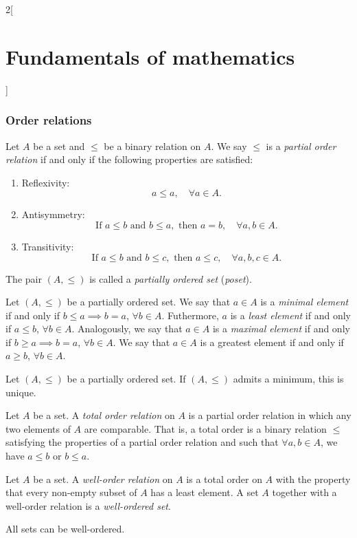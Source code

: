 \documentclass[../../../main.tex]{subfiles}
\begin{document}
\begin{multicols}{2}[\section{Fundamentals of mathematics}]
  \subsubsection{Order relations}
  \begin{definition}\label{FM_order-relations}
    Let $A$ be a set and $\leq$ be a binary relation on $A$. We say $\leq$ is a \emph{partial order relation} if and only if the following properties are satisfied:
    \begin{enumerate}
      \item Reflexivity:
            $$a\leq a,\quad\forall a\in A.$$
      \item Antisymmetry:
            $$\text{If }a\leq b\text{ and }b\leq a,\text{ then }a=b,\quad\forall a,b\in A.$$
      \item Transitivity:
            $$\text{If }a\leq b\text{ and }b\leq c,\text{ then }a\leq c,\quad\forall a,b,c\in A.$$
    \end{enumerate}
    The pair $(A,\leq)$ is called a \emph{partially ordered set} (\emph{poset}).
  \end{definition}
  \begin{definition}
    Let $(A,\leq)$ be a partially ordered set. We say that $a\in A$ is a \emph{minimal element} if and only if $b\leq a\implies b=a$, $\forall b\in A$. Futhermore, $a$ is a \emph{least element} if and only if $a\leq b$, $\forall b\in A$. Analogously, we say that $a\in A$ is a \emph{maximal element} if and only if $b\geq a\implies b=a$, $\forall b\in A$. We say that $a\in A$ is a greatest element if and only if $a\geq b$, $\forall b\in A$.
  \end{definition}
  \begin{lemma}
    Let $(A,\leq)$ be a partially ordered set. If $(A,\leq)$ admits a minimum, this is unique.
  \end{lemma}
  \begin{definition}
    Let $A$ be a set. A \emph{total order relation} on $A$ is a partial order relation in which any two elements of $A$ are comparable. That is, a total order is a binary relation $\leq$ satisfying the properties of a partial order relation and such that $\forall a,b\in A$, we have $a\leq b$ or $b\leq a$.
  \end{definition}
  \begin{definition}
    Let $A$ be a set. A \emph{well-order relation} on $A$ is a total order on $A$ with the property that every non-empty subset of $A$ has a least element. A set $A$ together with a well-order relation is a \emph{well-ordered set}.
  \end{definition}
  \begin{theorem}
    All sets can be well-ordered.
  \end{theorem}

\end{multicols}
\end{document}

